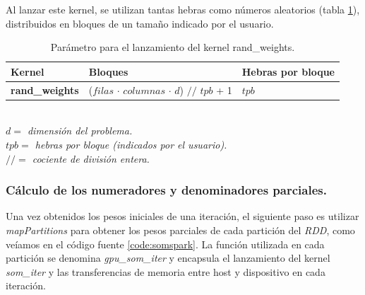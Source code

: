 Al lanzar este kernel, se utilizan tantas hebras como números aleatorios (tabla \ref{tab:randkernel}), distribuidos en bloques de un tamaño indicado por el usuario.
\begin{table}[ht]
\begin{tabular}{@{}lll@{}}
\toprule
\textbf{Kernel}        & \textbf{Bloques}                                 & \textbf{Hebras por bloque}                                                                       \\ \midrule
\textbf{rand\_weights} & ($filas$ $\cdot$ $columnas$ $\cdot$ $d$) $//$ $tpb$ + 1 & $tpb$ \\ \bottomrule
\end{tabular}

\textit{\\$d=$ dimensión del problema.\\$tpb=$ hebras por bloque (indicados por el usuario).\\ $//=$ cociente de división entera.}
\caption{Parámetro para el lanzamiento del kernel rand\_weights.}
\label{tab:randkernel}
\end{table}

\subsubsection{Cálculo de los numeradores y denominadores parciales.}
Una vez obtenidos los pesos iniciales de una iteración, el siguiente paso es utilizar \textit{mapPartitions} para obtener los pesos parciales de cada partición del \textit{RDD}, como veíamos en el código fuente \ref{code:somspark}. La función utilizada en cada partición se denomina \textit{gpu\_som\_iter} y encapsula el lanzamiento del kernel \textit{som\_iter} y las transferencias de memoria entre host y dispositivo en cada iteración.\\

